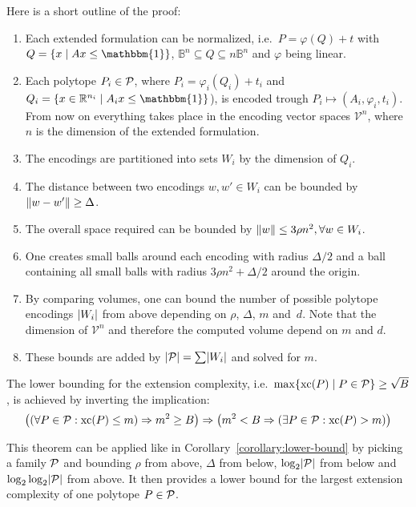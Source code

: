 Here is a short outline of the proof:
\begin{enumerate}
  \item Each extended formulation can be normalized, i.e.\ $P = \varphi(Q) + t$ with\\ $Q = \{ x \mid Ax \leq \mathbbm{1} \}$, $\mathbb{B}^n \subseteq Q \subseteq n\mathbb{B}^n$ and $\varphi$ being linear.
  \item Each polytope $P_i \in \P$, where $P_i = \varphi_i(Q_i) + t_i$ and $Q_i = \{ x \in \R^{n_i} \mid A_ix \leq \mathbbm{1} \}$), is encoded trough $P_i \mapsto (A_i, \varphi_i, t_i)$.\\
        From now on everything takes place in the encoding vector spaces $\mathcal{V}^n$, where $n$ is the dimension of the extended formulation.
  \item The encodings are partitioned into sets $W_i$ by the dimension of $Q_i$.
  \item The distance between two encodings $w, w' \in W_i$ can be bounded by $\norm{w - w'} \geq \Delta$.
  \item The overall space required can be bounded by $\norm{w} \leq 3\rho n^2, \forall w \in W_i$.
  \item One creates small balls around each encoding with radius $\Delta/2$ and a ball containing all small balls with radius $3\rho n^2 + \Delta/2$ around the origin.
  \item By comparing volumes, one can bound the number of possible polytope encodings $\abs{W_i}$ from above depending on $\rho$, $\Delta$, $m$ and~$d$. Note that the dimension of $\mathcal{V}^n$ and therefore the computed volume depend on $m$ and $d$.
  \item These bounds are added by $\abs{\P} = \sum \abs{W_i}$ and solved for $m$.
\end{enumerate}

The lower bounding for the extension complexity, i.e.\ $\max \{\xc(P) \mid P \in \P\}  \geq \sqrt{B}$, is achieved by inverting the implication:
$$ \left( \left( \forall P\in\P: \xc(P) \leq m \right) \Rightarrow m^2 \geq B \right) \Rightarrow \left( m^2 < B \Rightarrow \left( \exists P\in\P: \xc(P) > m \right) \right) $$

This theorem can be applied like in Corollary~\ref{corollary:lower-bound} by picking a family $\P$ and bounding $\rho$ from above, $\Delta$ from below, $\log_2 \abs{\P}$ from below and $\log_2\log_2 \abs{\P}$ from above. It then provides a lower bound for the largest extension complexity of one polytope $P \in \P$.
